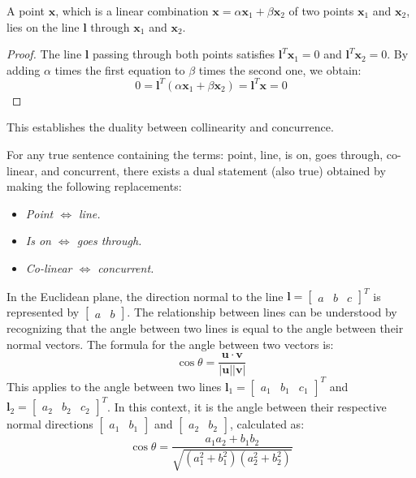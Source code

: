\begin{property}
    A point $\mathbf{x}$, which is a linear combination $\mathbf{x}=\alpha \mathbf{x}_1+\beta \mathbf{x}_2$ of two points $\mathbf{x}_1$ and $\mathbf{x}_2$, lies on the line $\mathbf{l}$ through $\mathbf{x}_1$ and $\mathbf{x}_2$. 
\end{property}
\begin{proof}
    The line $\mathbf{l}$ passing through both points satisfies $\mathbf{l}^T\mathbf{x}_1=0$ and $\mathbf{l}^T\mathbf{x}_2=0$. 
    By adding $\alpha$ times the first equation to $\beta$ times the second one, we obtain: 
    \[0=\mathbf{l}^T\left( \alpha \mathbf{x}_1+\beta \mathbf{x}_2 \right)=\mathbf{l}^T\mathbf{x}=0\]
\end{proof}
This establishes the duality between collinearity and concurrence.
\begin{theorem}
    For any true sentence containing the terms: point, line, is on, goes through, co-linear, and concurrent, there exists a dual statement (also true) obtained by making the following replacements:
\end{theorem}
\begin{itemize}
    \item \textit{Point $\Leftrightarrow$ line.}
    \item \textit{Is on $\Leftrightarrow$ goes through.}
    \item \textit{Co-linear $\Leftrightarrow$ concurrent.}
\end{itemize}
In the Euclidean plane, the direction normal to the line $\mathbf{l}={\begin{bmatrix} a & b & c \end{bmatrix}}^T$ is represented by $\begin{bmatrix} a & b \end{bmatrix}$. 
The relationship between lines can be understood by recognizing that the angle between two lines is equal to the angle between their normal vectors.
The formula for the angle between two vectors is:
\[\cos\theta=\dfrac{\mathbf{u} \cdot \mathbf{v}}{\left\lvert \mathbf{u} \right\rvert \left\lvert \mathbf{v} \right\rvert}\] 
This applies to the angle between two lines $\mathbf{l}_1={\begin{bmatrix} a_1 & b_1 & c_1 \end{bmatrix}}^T$ and $\mathbf{l}_2={\begin{bmatrix} a_2 & b_2 & c_2 \end{bmatrix}}^T$. 
In this context, it is the angle between their respective normal directions $\begin{bmatrix} a_1 & b_1 \end{bmatrix}$ and $\begin{bmatrix} a_2 & b_2 \end{bmatrix}$, calculated as:
\[\cos\theta=\dfrac{a_1a_2+b_1b_2}{\sqrt{\left( a_1^2 + b_1^2 \right)\left( a_2^2 + b_2^2 \right)}}\]



